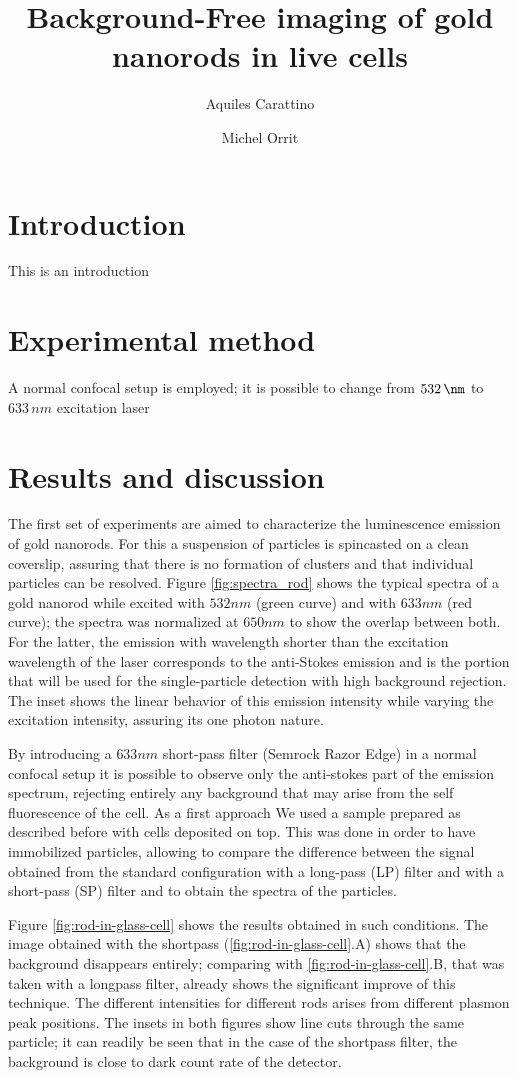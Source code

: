 \documentclass[twocolumn]{article}
\title{Background-Free imaging of gold nanorods in live cells}
\author{Aquiles Carattino \and Michel Orrit}
\begin{document}
\maketitle
{}
\section{Introduction}
This is an introduction

\section{Experimental method}
A normal confocal setup is employed; it is possible to change from $532\,\nm$ to
$633\,nm$ excitation laser

\section{Results and discussion}
The first set of experiments are aimed to characterize the luminescence emission
of gold nanorods. For this a suspension of particles is spincasted on a clean
coverslip, assuring that there is no formation of clusters and that individual
particles can be resolved. Figure \ref{fig:spectra_rod} shows the typical
spectra of a gold nanorod while excited with $532nm$ (green curve) and with
$633nm$ (red curve); the spectra was normalized at $650nm$ to show the overlap
between both. For the latter, the emission with wavelength shorter than the
excitation wavelength of the laser corresponds to the anti-Stokes emission and is the
portion that will be used for the single-particle detection with high background
rejection. The inset shows the linear behavior of this emission intensity while
varying the excitation intensity, assuring its one photon nature.

By introducing a $633nm$ short-pass filter (Semrock Razor Edge) in a normal
confocal setup it is possible to observe only the anti-stokes part of the
emission spectrum, rejecting entirely any background that may arise from the
self fluorescence of the cell. As a first approach We used a sample prepared as
described before with cells deposited on top. This was done in order to have
immobilized particles, allowing to compare the difference between the signal
obtained from the standard configuration with a long-pass (LP) filter and with a
short-pass (SP) filter and to obtain the spectra of the particles. 

Figure \ref{fig:rod-in-glass-cell} shows the results obtained in such
conditions. The image obtained with the shortpass
(\ref{fig:rod-in-glass-cell}.A) shows that the background disappears entirely;
comparing with \ref{fig:rod-in-glass-cell}.B, that was taken with a longpass
filter, already shows the significant improve of this technique. The different
intensities for different rods arises from different plasmon peak positions. The
insets in both figures show line cuts through the same particle; it can readily
be seen that in the case of the shortpass filter, the background is close to 
dark count rate of the detector. 
\end{document}
